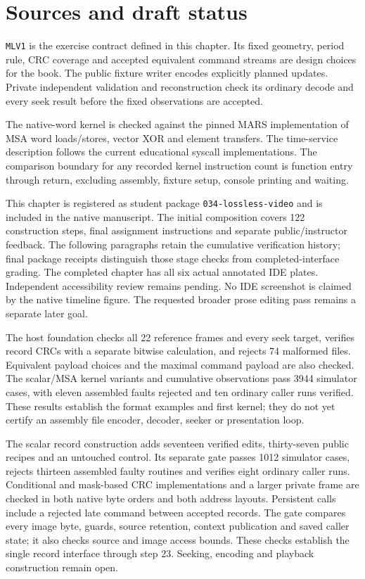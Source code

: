 \section{Sources and draft status}
\texttt{MLV1} is the exercise contract defined in this chapter. Its fixed geometry,
period rule, CRC coverage and accepted equivalent command streams are design choices
for the book. The public fixture writer encodes explicitly planned updates. Private
independent validation and reconstruction check its ordinary decode and every seek
result before the fixed observations are accepted.

The native-word kernel is checked against the pinned MARS implementation of MSA
word loads/stores, vector XOR and element transfers. The time-service description
follows the current educational syscall implementations. The comparison boundary
for any recorded kernel instruction count is function entry through return, excluding
assembly, fixture setup, console printing and waiting.

This chapter is registered as student package \texttt{034-lossless-video} and is
included in the native manuscript. The initial composition covers 122 construction
steps, final assignment instructions and separate public/instructor feedback.
The following paragraphs retain the cumulative verification history; final package
receipts distinguish those stage checks from completed-interface grading.
The completed chapter has all six actual annotated IDE plates. Independent
accessibility review remains pending.
No IDE screenshot is claimed by the native timeline figure. The requested broader
prose editing pass remains a separate later goal.

The host foundation checks all 22 reference frames and every seek target, verifies
record CRCs with a separate bitwise calculation, and rejects 74 malformed files.
Equivalent payload choices and the maximal command payload are also checked. The
scalar/MSA kernel variants and cumulative observations pass 3944 simulator cases,
with eleven assembled faults rejected and ten ordinary caller runs verified.
These results establish the format examples and first kernel; they do not yet
certify an assembly file encoder, decoder, seeker or presentation loop.

The scalar record construction adds seventeen verified edits, thirty-seven public
recipes and an untouched control. Its separate gate passes 1012 simulator cases,
rejects thirteen assembled faulty routines and verifies eight ordinary caller
runs. Conditional and mask-based CRC implementations and a larger private frame
are checked in both native byte orders and both address layouts. Persistent calls
include a rejected late command between accepted records. The gate compares every
image byte, guards, source retention, context publication and saved caller state;
it also checks source and image access bounds. These checks establish the single
record interface through step 23. Seeking, encoding and playback construction remain open.

